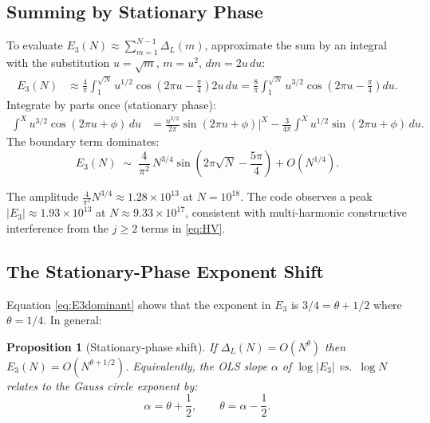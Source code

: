 \documentclass[12pt]{article}
\newtheorem{proposition}[theorem]{Proposition}
\theoremstyle{definition}
\begin{document}
\subsection{Summing by Stationary Phase}

To evaluate $E_3(N) \approx \sum_{m=1}^{N-1}\Delta_L(m)$, approximate
the sum by an integral with the substitution $u = \sqrt{m}$,
$m = u^2$, $dm = 2u\,du$:
\begin{align}
    E_3(N)
    &\approx \frac{4}{\pi}\int_1^{\sqrt{N}} u^{1/2}
    \cos\!\left(2\pi u - \frac{\pi}{4}\right) 2u\,du
    = \frac{8}{\pi}\int_1^{\sqrt{N}} u^{3/2}
    \cos\!\left(2\pi u - \frac{\pi}{4}\right) du.
    \label{eq:statint}
\end{align}
Integrate by parts once (stationary phase):
\begin{align}
    \int^X u^{3/2}\cos(2\pi u + \phi)\,du
    &= \frac{u^{3/2}}{2\pi}\sin(2\pi u + \phi)\Big|^X
    - \frac{3}{4\pi}\int^X u^{1/2}\sin(2\pi u + \phi)\,du.
    \label{eq:ibp}
\end{align}
The boundary term dominates:
\begin{equation}
    \boxed{E_3(N) \;\sim\;
    \frac{4}{\pi^2}\,N^{3/4}
    \sin\!\left(2\pi\sqrt{N} - \frac{5\pi}{4}\right)
    + O\!\left(N^{1/4}\right).}
    \label{eq:E3dominant}
\end{equation}

The amplitude $\frac{4}{\pi^2}N^{3/4} \approx 1.28\times 10^{13}$ at
$N = 10^{18}$.  The code observes a peak $|E_3| \approx 1.93\times 10^{13}$
at $N \approx 9.33\times 10^{17}$, consistent with multi-harmonic
constructive interference from the $j \ge 2$ terms in \eqref{eq:HV}.

\subsection{The Stationary-Phase Exponent Shift}

Equation \eqref{eq:E3dominant} shows that the exponent in $E_3$ is
$3/4 = \theta + 1/2$ where $\theta = 1/4$.  In general:

\begin{proposition}[Stationary-phase shift]
\label{prop:shift}
If $\Delta_L(N) = O(N^{\theta})$ then
$E_3(N) = O(N^{\theta + 1/2})$.
Equivalently, the OLS slope $\alpha$ of $\log|E_3|$ vs.\ $\log N$
relates to the Gauss circle exponent by:
\[
    \alpha = \theta + \frac{1}{2}, \qquad \theta = \alpha - \frac{1}{2}.
\]
\end{proposition}
\end{document}
